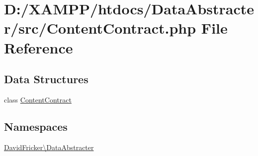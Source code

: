 \hypertarget{_content_contract_8php}{}\section{D\+:/\+X\+A\+M\+P\+P/htdocs/\+Data\+Abstracter/src/\+Content\+Contract.php File Reference}
\label{_content_contract_8php}
\subsection*{Data Structures}
\begin{DoxyCompactItemize}
\item 
class \hyperlink{class_david_fricker_1_1_data_abstracter_1_1_content_contract}{Content\+Contract}
\end{DoxyCompactItemize}
\subsection*{Namespaces}
\begin{DoxyCompactItemize}
\item 
 \hyperlink{namespace_david_fricker_1_1_data_abstracter}{David\+Fricker\textbackslash{}\+Data\+Abstracter}
\end{DoxyCompactItemize}
